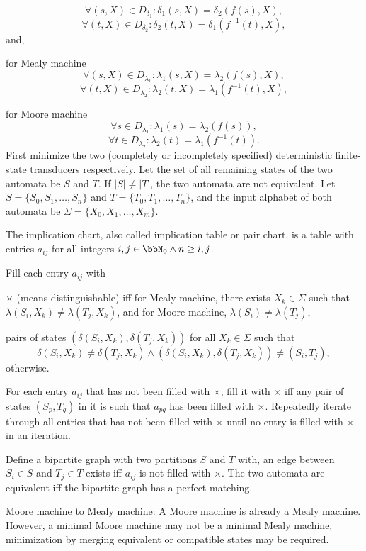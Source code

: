 \documentclass[a4paper,12pt]{report}
\begin{document}
\[\forall(s,X)\in D_{\delta_1}\colon\delta_1(s,X)=\delta_2(f(s),X),\]
\[\forall(t,X)\in D_{\delta_2}\colon\delta_2(t,X)=\delta_1(f^{-1}(t),X),\]
and,
\bit
\item for Mealy machine
\[\forall(s,X)\in D_{\lambda_1}\colon\lambda_1(s,X)=\lambda_2(f(s),X),\]
\[\forall(t,X)\in D_{\lambda_2}\colon\lambda_2(t,X)=\lambda_1(f^{-1}(t),X),\]
\item for Moore machine
\[\forall s\in D_{\lambda_1}\colon\lambda_1(s)=\lambda_2(f(s)),\]
\[\forall t\in D_{\lambda_2}\colon\lambda_2(t)=\lambda_1(f^{-1}(t)).\]
\eit
{}
First minimize the two (completely or incompletely specified) deterministic finite-state transducers respectively. Let the set of all remaining states of the two automata be $S$ and $T$. If $|S|\neq |T|$, the two automata are not equivalent. Let $S=\{S_0,S_1,\ldots,S_n\}$ and $T=\{T_0,T_1,\ldots,T_n\}$, and the input alphabet of both automata be $\Sigma=\{X_0,X_1,\ldots,X_m\}$.
\ben
\item The implication chart, also called implication table or pair chart, is a table with entries $a_{ij}$ for all integers $i,j\in\bbN_0\land n\geq i,j$.
\item Fill each entry $a_{ij}$ with
\bit
\item $\times$ (means distinguishable) iff for Mealy machine, there exists $X_k\in\Sigma$ such that $\lambda(S_i,X_k)\neq\lambda(T_j,X_k)$, and for Moore machine, $\lambda(S_i)\neq\lambda(T_j)$,
\item pairs of states $(\delta(S_i,X_k),\delta(T_j,X_k))$ for all $X_k\in\Sigma$ such that
\[\delta(S_i,X_k)\neq\delta(T_j,X_k)\land(\delta(S_i,X_k),\delta(T_j,X_k))\neq(S_i,T_j),\]
otherwise.
\eit
\item For each entry $a_{ij}$ that has not been filled with $\times$, fill it with $\times$ iff any pair of states $(S_p,T_q)$ in it is such that $a_{pq}$ has been filled with $\times$. Repeatedly iterate through all entries that has not been filled with $\times$ until no entry is filled with $\times$ in an iteration.
\item Define a bipartite graph with two partitions $S$ and $T$ with, an edge between $S_i\in S$ and $T_j\in T$ exists iff $a_{ij}$ is not filled with $\times$. The two automata are equivalent iff the bipartite graph has a perfect matching.
\een
{}
\bit
\item Moore machine to Mealy machine: A Moore machine is already a Mealy machine. However, a minimal Moore machine may not be a minimal Mealy machine, minimization by merging equivalent or compatible states may be required.
\end{document}
